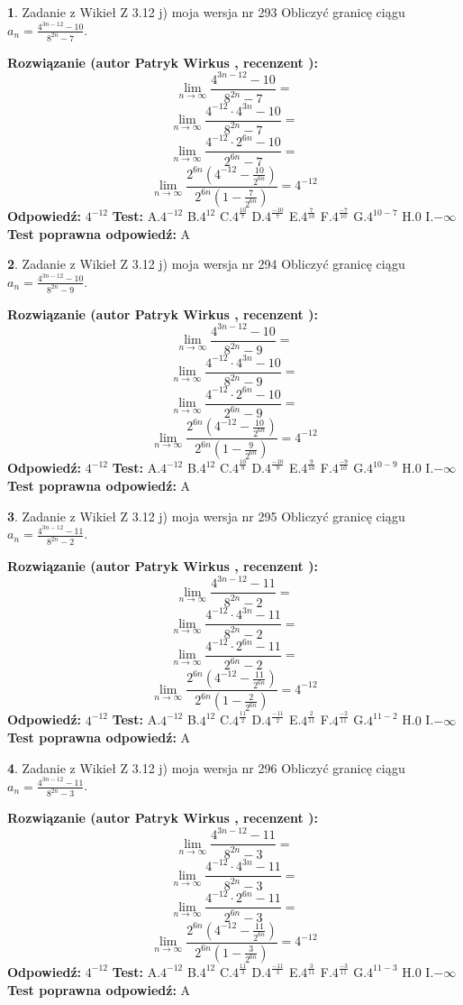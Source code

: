 \documentclass[12pt, a4paper]{article}
\theoremstyle{definition} %
\newtheorem{zad}{}
\newcommand{\zadStart}[1]{\begin{zad}#1\newline}
\newcommand{\zadStop}{\end{zad}}
\newcommand{\rozwStart}[2]{\noindent \textbf{Rozwiązanie (autor #1 , recenzent #2): }\newline}
\newcommand{\rozwStop}{\newline}
\newcommand{\odpStart}{\noindent \textbf{Odpowiedź:}\newline}
\newcommand{\odpStop}{\newline}
\newcommand{\testStart}{\noindent \textbf{Test:}\newline}
\newcommand{\testStop}{\newline}
\newcommand{\kluczStart}{\noindent \textbf{Test poprawna odpowiedź:}\newline}
\newcommand{\kluczStop}{\newline}
\begin{document}
\zadStart{Zadanie z Wikieł Z 3.12 j) moja wersja nr 293}
Obliczyć granicę ciągu $a_{n}=\frac{4^{3n-12}-10}{8^{2n}-7}$.
\zadStop
\rozwStart{Patryk Wirkus}{}
$$\lim\limits_{n\to\infty}\frac{4^{3n-12}-10}{8^{2n}-7}=$$
$$\lim\limits_{n\to\infty}\frac{4^{-12} \cdot 4^{3n}-10}{8^{2n}-7}=$$
$$\lim\limits_{n\to\infty}\frac{4^{-12} \cdot 2^{6n}-10}{2^{6n}-7}=$$
$$\lim\limits_{n\to\infty}\frac{2^{6n}(4^{-12} - \frac{10}{2^{6n}})}{2^{6n}(1-\frac{7}{2^{6n}})}= 4^{-12}$$
\rozwStop
\odpStart
$4^{-12}$
\odpStop
\testStart
A.$4^{-12}$
B.$4^{12}$
C.$4^{\frac{10}{7}}$
D.$4^{\frac{-10}{7}}$
E.$4^{\frac{7}{10}}$
F.$4^{\frac{-7}{10}}$
G.$4^{10-7}$
H.$0$
I.$-\infty$
\testStop
\kluczStart
A
\kluczStop



\zadStart{Zadanie z Wikieł Z 3.12 j) moja wersja nr 294}
Obliczyć granicę ciągu $a_{n}=\frac{4^{3n-12}-10}{8^{2n}-9}$.
\zadStop
\rozwStart{Patryk Wirkus}{}
$$\lim\limits_{n\to\infty}\frac{4^{3n-12}-10}{8^{2n}-9}=$$
$$\lim\limits_{n\to\infty}\frac{4^{-12} \cdot 4^{3n}-10}{8^{2n}-9}=$$
$$\lim\limits_{n\to\infty}\frac{4^{-12} \cdot 2^{6n}-10}{2^{6n}-9}=$$
$$\lim\limits_{n\to\infty}\frac{2^{6n}(4^{-12} - \frac{10}{2^{6n}})}{2^{6n}(1-\frac{9}{2^{6n}})}= 4^{-12}$$
\rozwStop
\odpStart
$4^{-12}$
\odpStop
\testStart
A.$4^{-12}$
B.$4^{12}$
C.$4^{\frac{10}{9}}$
D.$4^{\frac{-10}{9}}$
E.$4^{\frac{9}{10}}$
F.$4^{\frac{-9}{10}}$
G.$4^{10-9}$
H.$0$
I.$-\infty$
\testStop
\kluczStart
A
\kluczStop



\zadStart{Zadanie z Wikieł Z 3.12 j) moja wersja nr 295}
Obliczyć granicę ciągu $a_{n}=\frac{4^{3n-12}-11}{8^{2n}-2}$.
\zadStop
\rozwStart{Patryk Wirkus}{}
$$\lim\limits_{n\to\infty}\frac{4^{3n-12}-11}{8^{2n}-2}=$$
$$\lim\limits_{n\to\infty}\frac{4^{-12} \cdot 4^{3n}-11}{8^{2n}-2}=$$
$$\lim\limits_{n\to\infty}\frac{4^{-12} \cdot 2^{6n}-11}{2^{6n}-2}=$$
$$\lim\limits_{n\to\infty}\frac{2^{6n}(4^{-12} - \frac{11}{2^{6n}})}{2^{6n}(1-\frac{2}{2^{6n}})}= 4^{-12}$$
\rozwStop
\odpStart
$4^{-12}$
\odpStop
\testStart
A.$4^{-12}$
B.$4^{12}$
C.$4^{\frac{11}{2}}$
D.$4^{\frac{-11}{2}}$
E.$4^{\frac{2}{11}}$
F.$4^{\frac{-2}{11}}$
G.$4^{11-2}$
H.$0$
I.$-\infty$
\testStop
\kluczStart
A
\kluczStop



\zadStart{Zadanie z Wikieł Z 3.12 j) moja wersja nr 296}
Obliczyć granicę ciągu $a_{n}=\frac{4^{3n-12}-11}{8^{2n}-3}$.
\zadStop
\rozwStart{Patryk Wirkus}{}
$$\lim\limits_{n\to\infty}\frac{4^{3n-12}-11}{8^{2n}-3}=$$
$$\lim\limits_{n\to\infty}\frac{4^{-12} \cdot 4^{3n}-11}{8^{2n}-3}=$$
$$\lim\limits_{n\to\infty}\frac{4^{-12} \cdot 2^{6n}-11}{2^{6n}-3}=$$
$$\lim\limits_{n\to\infty}\frac{2^{6n}(4^{-12} - \frac{11}{2^{6n}})}{2^{6n}(1-\frac{3}{2^{6n}})}= 4^{-12}$$
\rozwStop
\odpStart
$4^{-12}$
\odpStop
\testStart
A.$4^{-12}$
B.$4^{12}$
C.$4^{\frac{11}{3}}$
D.$4^{\frac{-11}{3}}$
E.$4^{\frac{3}{11}}$
F.$4^{\frac{-3}{11}}$
G.$4^{11-3}$
H.$0$
I.$-\infty$
\testStop
\kluczStart
A
\kluczStop
\end{document}
